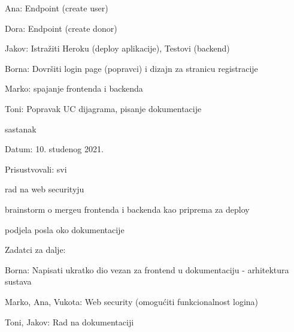 \begin{packed_enum}
\begin{packed_item}
\begin{packed_item}
                    \item Ana: Endpoint (create user)
                    \item Dora: Endpoint (create donor)
                    \item Jakov: Istražiti Heroku (deploy aplikacije), Testovi (backend)
                    \item Borna: Dovršiti login page (popravci) i dizajn za stranicu registracije
                    \item Marko: spajanje frontenda i backenda
                    \item Toni: Popravak UC dijagrama, pisanje dokumentacije
                \end{packed_item}
            \end{packed_item}
            
            \bigskip
            \item sastanak
            \item[] \begin{packed_item}
                \item Datum: 10. studenog 2021.
                \item Prisustvovali: svi
            	\item rad na web securityju
            	\item brainstorm o mergeu frontenda i backenda kao priprema za deploy
            	\item podjela posla oko dokumentacije
            	\item Zadatci za dalje:
            	\item[] \begin{packed_item}
            	   \item Borna: Napisati ukratko dio vezan za frontend u dokumentaciju - arhitektura sustava
		            \item Marko, Ana, Vukota: Web security (omogućiti funkcionalnost logina)
		            \item Toni, Jakov: Rad na dokumentaciji
            	\end{packed_item}
            \end{packed_item}
            

\end{packed_enum}
